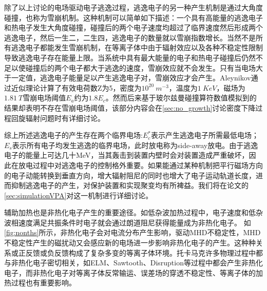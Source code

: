 \par
除了以上讨论的电场驱动电子逃逸过程，逃逸电子的另一种产生机制是通过大角度碰撞，也称为雪崩机制\cite{RN1793}。这种机制可以简单如下描述：一个具有高能量的逃逸电子和热电子发生大角度碰撞，碰撞后的两个电子速度均超过了临界速度然后形成两个逃逸电子，然后一生二，二生四，逃逸电子的数量就以雪崩指数增长。当然不是所有逃逸电子都能发生雪崩机制，在等离子体中由于辐射效应以及各种不稳定性限制导致逃逸电子存在能量上限\cite{RN874}。当系统中具有最大能量的电子和热电子碰撞后仍然不足以使碰撞后的两个电子都大于逃逸的速度，雪崩效应就不会发生。只有当电场大于一定值，逃逸电子能量足以产生逃逸电子对，雪崩效应才会产生。Aleynikov通过近似理论计算了有效电荷数Z为5，密度为$10^{20}~m^{-3}$，温度为$1~KeV$，磁场为$1.81~T$雪崩电场阈值$E_a$约为$1.8E_c$。然而后来基于玻尔兹曼碰撞算符数值模拟到的结果却表明不存在雪崩电场阈值\cite{RN1811}，该部分内容会在\autoref{sec:no_growth}讨论密度下降过程回旋辐射问题时有详细讨论。

综上所述逃逸电子的产生存在两个临界电场:$E_c^*$表示产生逃逸电子所需最低电场；$E_s$表示所有电子均发生逃逸的临界电场，此时放电称为side-away放电。由于逃逸电子的能量上可达几十MeV，当其轰击到装置内壁时会对装置造成严重破坏，因此在放电过程中对逃逸电子的控制格外重要。如果能通过某种机制把平行磁场方向的电子动能转换到垂直方向，增大辐射阻尼的同时也增大了电子运动轨道长度，进而抑制逃逸电子的产生，对保护装置\cite{RN1866}和实现聚变均有所裨益。我们将在论文的\autoref{sec:simulationVPA}对这一机制进行详细讨论。

辅助加热也是非热化电子产生的重要途径。如低杂波加热过程中，电子速度和低杂波相速度满足共振条件时电子就会通过朗道阻尼获得能量成为非热化电子。 如\autoref{fig:nonths}所示，非热化电子会对电流分布产生影响，驱动MHD不稳定性，MHD不稳定性产生的磁扰动又会感应新的电场进一步影响非热化电子的产生。这种种关系或正反馈或负反馈构成了复杂多变的等离子体环境。托卡马克许多物理过程中都与非热化电子密切相关，如ELM\cite{RN1868}、Sawtooth\cite{RN1917}、Disruption\cite{RN985}等过程中都会产生非热化电子，而非热化电子对等离子体反常输运\cite{RN986}、误差场的穿透不稳定性\cite{RN987}、等离子体的加热过程\cite{RN1697}也有重要影响。

